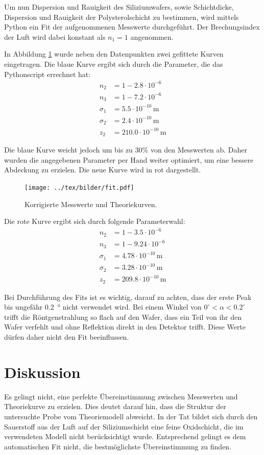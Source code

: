Um nun Dispersion und Rauigkeit des Siliziumwafers, sowie Schichtdicke, Dispersion und Rauigkeit der Polysterolschicht zu bestimmen, wird mittels Python ein Fit der aufgenommenen Messwerte durchgeführt. Der Brechungsindex der Luft wird dabei konstant als $n_1=1$ angenommen.

In Abbildung \ref{pic:fit} wurde neben den Datenpunkten zwei gefittete Kurven eingetragen. Die blaue Kurve ergibt sich durch die Parameter, die das Pythonscript errechnet hat:
\begin{align*}
	n_2 &= 1-2.8\cdot 10^{-6}\\
	n_3 &= 1-7.2\cdot 10^{-6}\\
	\sigma_1 &= 5.5\cdot 10^{-10}\,\si{\meter} \\
	\sigma_2 &= 2.4\cdot 10^{-10}\,\si{\meter}\\
	z_2&= 210.0\cdot 10^{-10}\,\si{\meter}
\end{align*}

Die blaue Kurve weicht jedoch um bis zu 30\% von den Messwerten ab. Daher wurden die angegebenen Parameter per Hand weiter optimiert, um eine bessere Abdeckung zu erzielen. Die neue Kurve wird in rot dargestellt.
\begin{figure}[H]
	\centering
	\texttt{[image: ../tex/bilder/fit.pdf]}
	\caption{Korrigierte Messwerte und Theoriekurven.}
	\label{pic:fit}
\end{figure}


Die rote Kurve ergibt sich durch folgende Parameterwahl:
\begin{align*}
n_2 &= 1-3.5\cdot 10^{-6}\\
n_3 &= 1-9.24\cdot 10^{-6}\\
\sigma_1 &= 4.78\cdot 10^{-10}\,\si{\meter} \\
\sigma_2 &= 3.28\cdot 10^{-10}\,\si{\meter}\\
 z_2&= 209.8\cdot 10^{-10}\,\si{\meter}
\end{align*}

Bei Durchführung des Fits ist es wichtig, darauf zu achten, dass der erste Peak bis ungefähr \SI{0.2}{\degree} nicht verwendet wird. Bei einem Winkel von $0^\circ < \alpha < 0.2^\circ$ trifft die Röntgenstrahlung so flach auf den Wafer, dass ein Teil von ihr den Wafer verfehlt und ohne Reflektion direkt in den Detektor trifft. Diese Werte dürfen daher nicht den Fit beeinflussen.

\section{Diskussion}
Es gelingt nicht, eine perfekte Übereinstimmung zwischen Messwerten und Theoriekurve zu erzielen.
Dies deutet darauf hin, dass die Struktur der untersuchte Probe vom Theoriemodell abweicht. In der Tat bildet sich durch den Sauerstoff aus der Luft auf der Siliziumschicht eine feine Oxidschicht, die im verwendeten Modell nicht berücksichtigt wurde.
Entsprechend gelingt es dem automatischen Fit nicht, die bestmöglichste Übereinstimmung zu finden.

